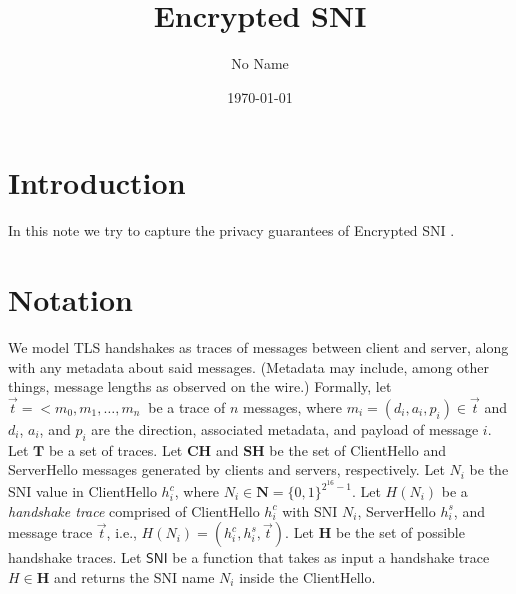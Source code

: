 \documentclass{article}
\title{Encrypted SNI}
\author{No Name}
\date{\today}
\begin{document}
\maketitle

\section{Introduction}

In this note we try to capture the privacy guarantees of Encrypted SNI \cite{ietf-tls-esni-04}.


\section{Notation}


We model TLS handshakes as traces of messages between client and server, along with any metadata
about said messages. (Metadata may include, among other things, message lengths as observed on
the wire.) Formally, let $\vec{t} = <m_0, m_1, \dots, m_n\>$ be a trace of $n$ messages, where
$m_i = (d_i, a_i, p_i) \in \vec{t}$ and $d_i$, $a_i$, and $p_i$ are the direction, associated
metadata, and payload of message $i$. Let $\mathbf{T}$ be a set of traces. Let $\mathbf{CH}$ and
$\mathbf{SH}$ be the set of ClientHello and ServerHello messages generated by clients and servers,
respectively. Let $N_i$ be the SNI value in ClientHello $h^c_i$, where $N_i \in \mathbf{N} = \{0,1\}^{2^{16} - 1}$.
Let $H(N_i)$ be a \emph{handshake trace} comprised of ClientHello $h^c_i$ with SNI $N_i$, ServerHello $h^s_i$,
and message trace $\vec{t}$, i.e., $H(N_i) = (h^c_i, h^s_i, \vec{t})$. Let $\mathbf{H}$ be the set of possible
handshake traces. Let $\mathsf{SNI}$ be a function that takes as input a handshake trace $H \in \mathbf{H}$ 
and returns the SNI name $N_i$ inside the ClientHello.
\end{document}
